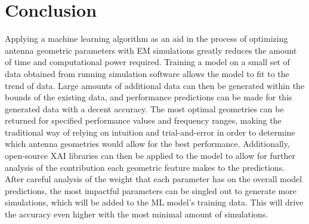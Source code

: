 \documentclass[conference]{IEEEtran}
\begin{document}
\section{Conclusion}
Applying a machine learning algorithm as an aid in the process of optimizing antenna geometric parameters with EM simulations greatly reduces the amount of time and computational power required. Training a model on a small set of data obtained from running simulation software allows the model to fit to the trend of data. Large amounts of additional data can then be generated within the bounds of the existing data, and performance predictions can be made for this generated data with a decent accuracy. The most optimal geometries can be returned for specified performance values and frequency ranges, making the traditional way of relying on intuition and trial-and-error in order to determine which antenna geometries would allow for the best performance. Additionally, open-source XAI libraries can then be applied to the model to allow for further analysis of the contribution each geometric feature makes to the predictions. After careful analysis of the weight that each parameter has on the overall model predictions, the most impactful parameters can be singled out to generate more simulations, which will be added to the ML model's training data. This will drive the accuracy even higher with the most minimal amount of simulations. 





\vfill
\end{document}
